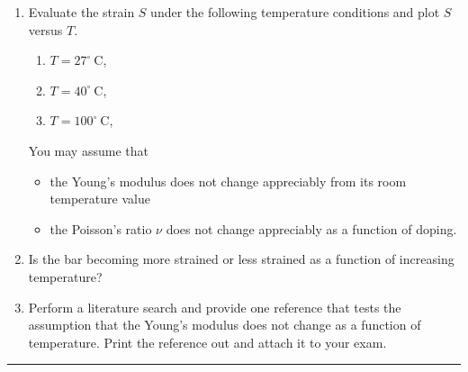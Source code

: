 \documentclass{article}
\newcommand{\horline}
           {\begin{center}
              \noindent\rule{8cm}{0.4pt}
            \end{center}}
\begin{document}
\begin{enumerate}
  \item{Evaluate the strain $S$ under the following temperature conditions and
        plot $S$ versus $T$.
        \begin{enumerate}
          \item{$T = 27^{\circ}~\mathrm{C}$,}
          \item{$T = 40^{\circ}~\mathrm{C}$,}
          \item{$T = 100^{\circ}~\mathrm{C}$,}
        \end{enumerate}
        You may assume that
        \begin{itemize}
          \item{the Young's modulus does not change appreciably from its
                room temperature value}
          \item{the Poisson's ratio $\nu$ does not change appreciably as a
                function of doping.}
        \end{itemize}
       }
       \item{Is the bar becoming more strained or less strained as a function 
             of increasing temperature?}
       \item{Perform a literature search and provide one reference that tests
             the assumption that the Young's modulus does not change as a 
             function of temperature. Print the reference out and attach it
             to your exam.}
\end{enumerate}
\horline
\end{document}
